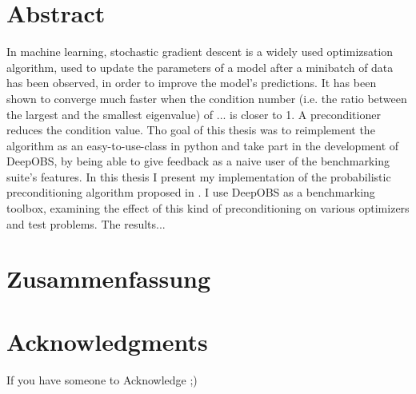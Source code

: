 \documentclass[twoside,12pt,a4paper]{report}
\begin{document}

\setcounter{page}{1}



\section*{Abstract}
In machine learning, stochastic gradient descent is a widely used optimizsation algorithm, used to update the parameters of a model after a minibatch of data has been observed, in order to improve the model's predictions. It has been shown to converge much faster when the condition number (i.e. the ratio between the largest and the smallest eigenvalue) of ... is closer to 1. A preconditioner reduces the condition value.
Tho goal of this thesis was to reimplement the algorithm as an easy-to-use-class in python and take part in the development of DeepOBS, by being able to give feedback as a naive user of the benchmarking suite's features.
In this thesis I present my implementation of the probabilistic preconditioning algorithm proposed in \cite{de2019active}. I use DeepOBS  as a benchmarking toolbox, examining the effect of this kind of preconditioning on various optimizers and test problems. 
The results...

\newpage
\section*{Zusammenfassung}

\newpage
\section*{Acknowledgments}
If you have someone to Acknowledge ;)
\cleardoublepage


\renewcommand{\baselinestretch}{1.3}
\small\normalsize
\end{document}
